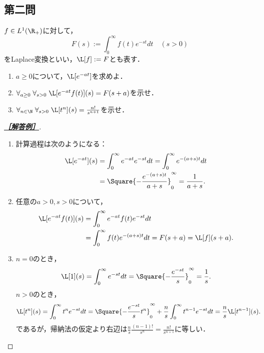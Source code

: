 \documentclass[uplatex,dvipdfmx]{jsarticle}
\begin{document}
\subsection{第二問}

\begin{tcolorbox}[colframe=ForestGreen, colback=ForestGreen!10!white,breakable,colbacktitle=ForestGreen!40!white,coltitle=black,fonttitle=\bfseries\sffamily,
title=第２問]
    \begin{problem}
        $f\in L^1(\R_+)$に対して，
    \[F(s):=\int^\infty_0f(t)e^{-st}dt\quad(s>0)\]
    をLaplace変換といい，$\L[f]:=F$とも表す．
    \begin{enumerate}
        \item $a\ge0$について，$\L[e^{-at}]$を求めよ．
        \item $\forall_{a\ge0}\;\forall_{s>0}\;\L[e^{-at}f(t)](s)=F(s+a)$を示せ．
        \item $\forall_{n\in\N}\;\forall_{s>0}\;\L[t^n](s)=\frac{n!}{s^{n+1}}$を示せ．
    \end{enumerate}
    \end{problem}
\end{tcolorbox}
\begin{proof}[\textbf{\underline{［解答例］}}]\mbox{}
    \begin{enumerate}
        \item 計算過程は次のようになる：
        \begin{align*}
            \L[e^{-at}](s)&=\int^\infty_0e^{-at}e^{-st}dt=\int^\infty_0e^{-(a+s)t}dt\\
            &=\Square{-\frac{e^{-(a+s)t}}{a+s}}^\infty_0=\frac{1}{a+s}.
        \end{align*}
        \item 任意の$a>0,s>0$について，
        \begin{align*}
            \L[e^{-at}f(t)](s)&=\int^\infty_0e^{-at}f(t)e^{-st}dt\\
            &=\int^\infty_0f(t)e^{-(a+s)t}dt=F(s+a)=\L[f](s+a).
        \end{align*}
        \item $n=0$のとき，
        \[\L[1](s)=\int^\infty_0e^{-st}dt=\Square{-\frac{e^{-st}}{s}}^\infty_0=\frac{1}{s}.\]
        $n>0$のとき，
        \begin{align*}
            \L[t^n](s)&=\int^\infty_0t^ne^{-st}dt=\Square{-\frac{e^{-st}}{s}t^n}^\infty_0+\frac{n}{s}\int^\infty_0t^{n-1}e^{-st}dt=\frac{n}{s}\L[t^{n-1}](s).
        \end{align*}
        であるが，帰納法の仮定より右辺は$\frac{n}{s}\frac{(n-1)!}{s^{n}}=\frac{n!}{s^{n+1}}$に等しい．
    \end{enumerate}
\end{proof}
\end{document}
